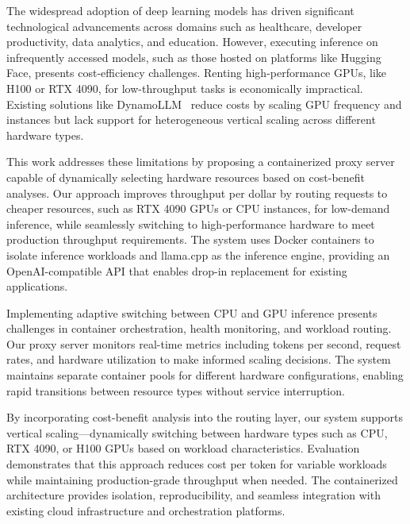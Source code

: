 \acresetall
\noindent The widespread adoption of deep learning models has driven significant technological advancements across domains such as healthcare, developer productivity, data analytics, and education. However, executing inference on infrequently accessed models, such as those hosted on platforms like Hugging Face, presents cost-efficiency challenges. Renting high-performance GPUs, like H100 or RTX 4090, for low-throughput tasks is economically impractical. Existing solutions like DynamoLLM~\cite{dynamollm} reduce costs by scaling GPU frequency and instances but lack support for heterogeneous vertical scaling across different hardware types.

This work addresses these limitations by proposing a containerized proxy server capable of dynamically selecting hardware resources based on cost-benefit analyses. Our approach improves throughput per dollar by routing requests to cheaper resources, such as RTX 4090 GPUs or CPU instances, for low-demand inference, while seamlessly switching to high-performance hardware to meet production throughput requirements. The system uses Docker containers to isolate inference workloads and llama.cpp as the inference engine, providing an OpenAI-compatible API that enables drop-in replacement for existing applications.

Implementing adaptive switching between CPU and GPU inference presents challenges in container orchestration, health monitoring, and workload routing. Our proxy server monitors real-time metrics including tokens per second, request rates, and hardware utilization to make informed scaling decisions. The system maintains separate container pools for different hardware configurations, enabling rapid transitions between resource types without service interruption.

By incorporating cost-benefit analysis into the routing layer, our system supports vertical scaling---dynamically switching between hardware types such as CPU, RTX 4090, or H100 GPUs based on workload characteristics. Evaluation demonstrates that this approach reduces cost per token for variable workloads while maintaining production-grade throughput when needed. The containerized architecture provides isolation, reproducibility, and seamless integration with existing cloud infrastructure and orchestration platforms.